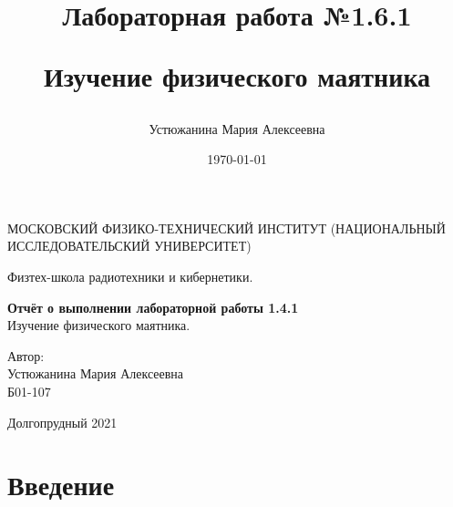 \documentclass[a4paper,12pt]{article} %
\author{Устюжанина Мария Алексеевна}
\title{Лабораторная работа №1.6.1

Изучение физического маятника
}
\date{\today}
\begin{document}
\begin{titlepage}
	\begin{center}
		{\large МОСКОВСКИЙ ФИЗИКО-ТЕХНИЧЕСКИЙ ИНСТИТУТ (НАЦИОНАЛЬНЫЙ ИССЛЕДОВАТЕЛЬСКИЙ УНИВЕРСИТЕТ)}
	\end{center}
	\begin{center}
		{\large Физтех-школа радиотехники и кибернетики.}
	\end{center}
	
	
	\vspace{4.5cm}
	{\huge
		\begin{center}
			{\bf Отчёт о выполнении лабораторной работы 1.4.1}\\
			 Изучение физического маятника.
		\end{center}
	}
	\vspace{2cm}
	\begin{flushright}
		{\LARGE Автор:\\ Устюжанина Мария Алексеевна \\
			\vspace{0.2cm}
			Б01-107}
	\end{flushright}
	\vspace{8cm}
	\begin{center}
		Долгопрудный 2021
	\end{center}
\end{titlepage}

\section*{Введение}
\end{document}
